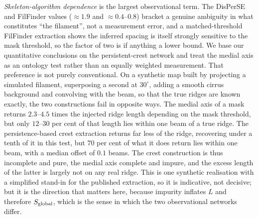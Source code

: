 \documentclass[usenatbib,twoside,twocolumn]{mnras}
\begin{document}
\emph{Skeleton-algorithm dependence} is the largest observational term. The DisPerSE and FilFinder values ($\approx1.9$ and $\approx0.4$--$0.8$) bracket a genuine ambiguity in what constitutes ``the filament'', not a measurement error, and a matched-threshold FilFinder extraction shows the inferred spacing is itself strongly sensitive to the mask threshold, so the factor of two is if anything a lower bound. We base our quantitative conclusions on the persistent-crest network and treat the medial axis as an ontology test rather than an equally weighted measurement. That preference is not purely conventional. On a synthetic map built by projecting a simulated filament, superposing a second at $30^\circ$, adding a smooth cirrus background and convolving with the beam, so that the true ridges are known exactly, the two constructions fail in opposite ways. The medial axis of a mask returns $2.3$--$4.5$ times the injected ridge length depending on the mask threshold, but only $12$--$30$ per cent of that length lies within one beam of a true ridge. The persistence-based crest extraction returns far less of the ridge, recovering under a tenth of it in this test, but $70$ per cent of what it does return lies within one beam, with a median offset of $0.1$ beams. The crest construction is thus incomplete and pure, the medial axis complete and impure, and the excess length of the latter is largely not on any real ridge. This is one synthetic realisation with a simplified stand-in for the published extraction, so it is indicative, not decisive; but it is the direction that matters here, because impurity inflates $L$ and therefore $S_{\rm global}$, which is the sense in which the two observational networks differ.
\end{document}
